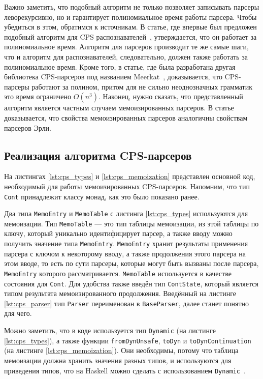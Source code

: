 \documentclass[times]{itmo-student-thesis}
\begin{document}
Важно заметить, что подобный алгоритм не только позволяет записывать парсеры леворекурсивно, но и гарантирует
полиномиальное время работы парсера. Чтобы убедиться в этом, обратимся к источникам. В статье, где впервые был предложен подобный алгоритм для CPS
распознавателей~\cite{johnson_memoization_1995}, утверждается, что он работает  за полиномиальное время. Алгоритм для парсеров
производит те же самые шаги, что и алгоритм для распознавателей, следовательно,  должен также работать за полиномиальное
время. Кроме того, в статье, где была разработана другая библиотека CPS-парсеров под названием Meerkat~\cite{izmaylova_practical_2016},  доказывается,
что CPS-парсеры работают за полином, притом для не сильно неоднозначных грамматик это время ограничено
$O(n^3)$. Наконец, нужно сказать, что представленный алгоритм является частным случаем мемоизированных
парсеров. В статье~\cite{norvig_techniques_1991} доказывается, что свойства мемоизированных парсеров аналогичны свойствам
парсеров Эрли.

\subsection{Реализация алгоритма CPS-парсеров}

На листингах \ref{lst:cps_types} и \ref{lst:cps_memoization} представлен основной код, необходимый для работы мемоизированных CPS-парсеров. Напомним,
что тип \lstinline{Cont} принадлежит классу монад, как это было показано ранее.

Два типа \lstinline{MemoEntry} и \lstinline{MemoTable} с листинга \ref{lst:cps_types} используются для мемоизации.
Тип \lstinline{MemoTable} --- это тип таблицы мемоизации, из этой таблицы по ключу, который уникально идентифицирует
парсер, а также вводу можно получить значение типа \lstinline{MemoEntry}. \lstinline{MemoEntry} хранит результаты
применения парсера с ключом к некоторому вводу, а также продолжения этого парсера на этом вводе, то есть по сути
парсеры, которые могут быть вызваны после парсера,
\lstinline{MemoEntry} которого рассматривается. \lstinline{MemoTable} используется в качестве состояния для \lstinline{Cont}. Для
удобства также введён тип \lstinline{ContState}, который является типом результата мемоизированного продолжения.
Введённый на листинге \ref{lst:cps_parser} тип \lstinline{Parser} переименован в \lstinline{BaseParser}, далее станет
понятно для чего.

Можно заметить, что в коде используется тип \lstinline{Dynamic} (на листинге \ref{lst:cps_types}), а также функции
\lstinline{fromDynUnsafe}, \lstinline{toDyn} и \lstinline{toDynContinuation} (на листинге \ref{lst:cps_memoization}).
Они необходимы, потому что таблица мемоизации должна хранить значения разных типов, и используются для приведения
типов, что на Haskell можно сделать с использованием \lstinline{Dynamic}~\cite{noauthor_datadynamic_nodate}.
\end{document}

